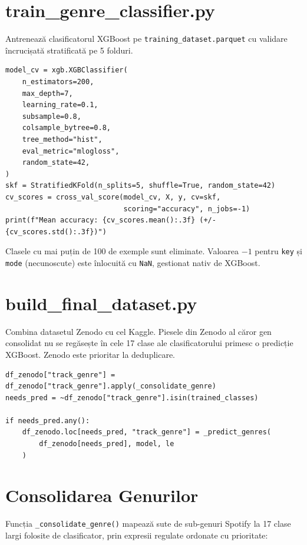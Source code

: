 \documentclass[12pt,a4paper]{report}
\begin{document}
\section{train\_genre\_classifier.py}

Antrenează clasificatorul XGBoost pe \texttt{training\_dataset.parquet} cu
validare încrucișată stratificată pe 5 folduri.

\begin{lstlisting}[style=python, caption={Antrenarea clasificatorului XGBoost cu cross-validare}]
model_cv = xgb.XGBClassifier(
    n_estimators=200,
    max_depth=7,
    learning_rate=0.1,
    subsample=0.8,
    colsample_bytree=0.8,
    tree_method="hist",
    eval_metric="mlogloss",
    random_state=42,
)
skf = StratifiedKFold(n_splits=5, shuffle=True, random_state=42)
cv_scores = cross_val_score(model_cv, X, y, cv=skf,
                            scoring="accuracy", n_jobs=-1)
print(f"Mean accuracy: {cv_scores.mean():.3f} (+/- {cv_scores.std():.3f})")
\end{lstlisting}

Clasele cu mai puțin de 100 de exemple sunt eliminate. Valoarea $-1$ pentru
\texttt{key} și \texttt{mode} (necunoscute) este înlocuită cu \texttt{NaN},
gestionat nativ de XGBoost.

\section{build\_final\_dataset.py}

Combina datasetul Zenodo cu cel Kaggle. Piesele din Zenodo al căror gen
consolidat nu se regăsește în cele 17 clase ale clasificatorului primesc o
predicție XGBoost. Zenodo este prioritar la deduplicare.

\begin{lstlisting}[style=python, caption={Predicție XGBoost pentru piese fără gen în Zenodo}]
df_zenodo["track_genre"] = df_zenodo["track_genre"].apply(_consolidate_genre)
needs_pred = ~df_zenodo["track_genre"].isin(trained_classes)

if needs_pred.any():
    df_zenodo.loc[needs_pred, "track_genre"] = _predict_genres(
        df_zenodo[needs_pred], model, le
    )
\end{lstlisting}

\section{Consolidarea Genurilor}

Funcția \texttt{\_consolidate\_genre()} mapează sute de sub-genuri Spotify la
17 clase largi folosite de clasificator, prin expresii regulate ordonate cu
prioritate:
\end{document}
